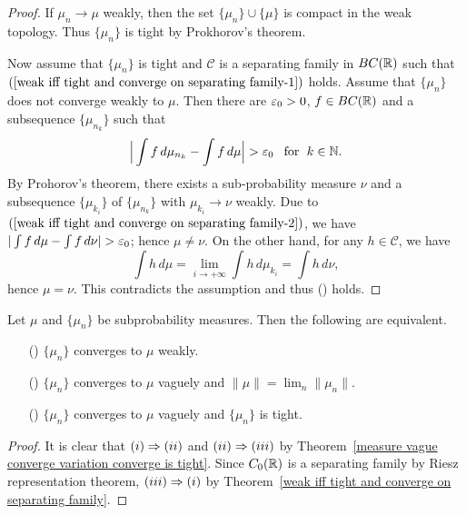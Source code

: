 \begin{proof}
If $\mu_n\to\mu$ weakly, then the set $\{\mu_n\}\cup\{\mu\}$ is compact in the weak topology. Thus $\{\mu_n\}$ is tight by Prokhorov's theorem.\par
Now assume that $\{\mu_n\}$ is tight and $\mathscr{C}$ is a separating family in $BC(\mathbb{R})$ such that $(\ref{weak iff tight and converge on separating family-1})$ holds. Assume that $\{\mu_n\}$ does not converge weakly to $\mu$. Then there are $\varepsilon_0>0$, $f\in BC(\mathbb{R})$ and a subsequence $\{\mu_{n_k}\}$ such that
\begin{align}\label{weak iff tight and converge on separating family-2}
\Big|\int f\,d\mu_{n_k}-\int f\,d\mu\Big|>\eps_0\for k\in\N.
\end{align}
By Prohorov's theorem, there exists a sub-probability measure $\nu$ and a subsequence $\{\mu_{k_i}\}$ of $\{\mu_{n_k}\}$ with $\mu_{k_i}\to\nu$ weakly. Due to $(\ref{weak iff tight and converge on separating family-2})$, we have $|\int f\,d\mu-\int f\,d\nu|>\eps_0$; hence $\mu\neq\nu$. On the other hand, for any $h\in\mathscr{C}$, we have 
\[\int h\,d\mu=\lim_{i\to+\infty}\int h\,d\mu_{k_i}=\int h\,d\nu,\]
hence $\mu=\nu$. This contradicts the assumption and thus () holds.
\end{proof}
\begin{corollary}
Let $\mu$ and $\{\mu_n\}$ be subprobability measures. Then the following are equivalent.
\begin{itemize}
\item[(\rmnum{1})] $\{\mu_n\}$ converges to $\mu$ weakly.
\item[(\rmnum{2})] $\{\mu_n\}$ converges to $\mu$ vaguely and $\|\mu\|=\lim_n\|\mu_n\|$.
\item[(\rmnum{3})] $\{\mu_n\}$ converges to $\mu$ vaguely and $\{\mu_n\}$ is tight.
\end{itemize}
\end{corollary}
\begin{proof}
It is clear that $(\rmnum{1})\Rightarrow(\rmnum{2})$ and $(\rmnum{2})\Rightarrow(\rmnum{3})$ by Theorem~\ref{measure vague converge variation converge is tight}. Since $C_0(\mathbb{R})$ is a separating family by Riesz representation theorem, $(\rmnum{3})\Rightarrow(\rmnum{1})$ by Theorem~\ref{weak iff tight and converge on separating family}.
\end{proof}
